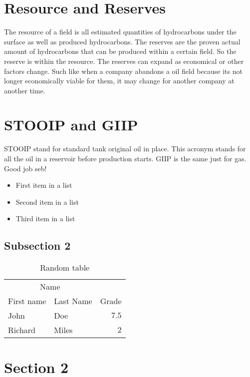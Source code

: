 \documentclass[DIV=calc, paper=a4, fontsize=11pt, twocolumn]{scrartcl}	 %
\begin{document}
\section*{Resource and Reserves}
The resource of a field is all estimated quantities of hydrocarbons under the surface as well as produced hydrocarbons. The reserves are the proven actual amount of hydrocarbons that can be produced within a certain field. So the reserve is within the resource. The reserves can expand as economical or other factors change. Such like when a company abandons a oil field because its not longer economically viable for them, it may change for another company at another time.
\section*{STOOIP and GIIP}
STOOIP stand for standard tank original oil in place. This acronym stands for all the oil in a reservoir before production starts. GIIP is the same just for gas.
Good job seb!


\begin{itemize}
\item First item in a list 
\item Second item in a list 
\item Third item in a list
\end{itemize}




\subsection*{Subsection 2}



\begin{table}
\caption{Random table}
\centering
\begin{tabular}{llr}
\toprule
\multicolumn{2}{c}{Name} \\
\cmidrule(r){1-2}
First name & Last Name & Grade \\
\midrule
John & Doe & $7.5$ \\
Richard & Miles & $2$ \\
\bottomrule
\end{tabular}
\end{table}


\section*{Section 2}
\end{document}
